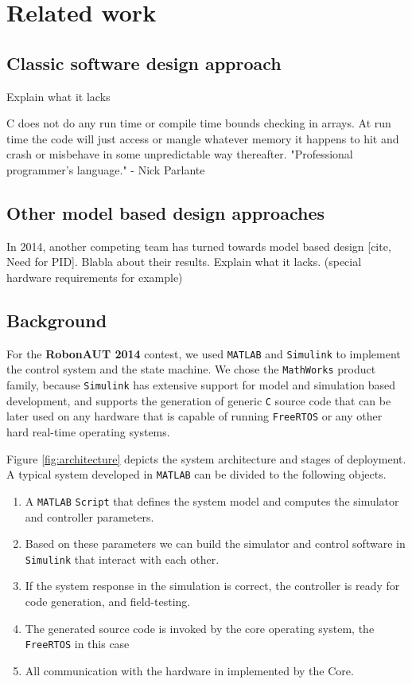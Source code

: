 \section{Related work}

\subsection{Classic software design approach}
Explain what it lacks

C does not do any run time or compile time bounds checking in arrays. At run time the code will just access or mangle whatever memory it happens to hit and crash or misbehave in some unpredictable way thereafter. "Professional programmer's language." - Nick Parlante\cite{clanguage}

\subsection{Other model based design approaches}
In 2014, another competing team has turned towards model based design [cite, Need for PID]. Blabla about their results.
Explain what it lacks. (special hardware requirements for example)

\subsection{Background} 

For the \textbf{RobonAUT 2014} contest, we used \verb!MATLAB! and \verb!Simulink! to implement the control system and the state machine. We chose the \verb!MathWorks! product family, because \verb!Simulink! has extensive support for model and simulation based development, and supports the generation of generic \verb!C! source code that can be later used on any hardware that is capable of running \verb!FreeRTOS! or any other hard real-time operating systems.

Figure \ref{fig:architecture} depicts the system architecture and stages of deployment. A typical system developed in \verb!MATLAB! can be divided to the following objects.

\begin{enumerate}
\item A \verb!MATLAB! \verb!Script! that defines the system model and computes the simulator and controller parameters.
\item Based on these parameters we can build the simulator and control software in \verb!Simulink! that interact with each other.
\item If the system response in the simulation is correct, the controller is ready for code generation, and field-testing.
\item The generated source code is invoked by the core operating system, the \verb!FreeRTOS! in this case
\item All communication with the hardware in implemented by the Core.
\end{enumerate}


